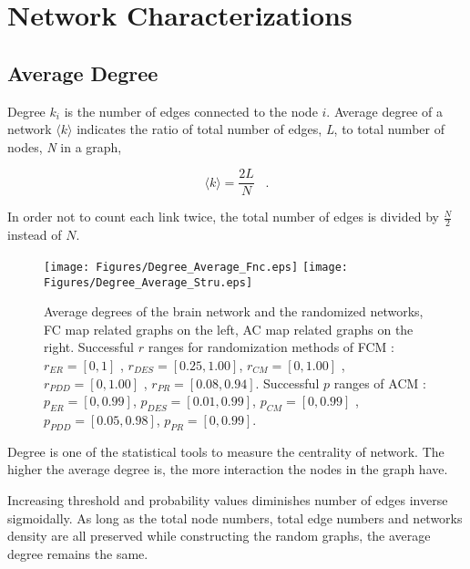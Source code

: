 
\chapter{Network Characterizations} %

\label{AppendixB} %


\section{Average Degree}

Degree $k_i$ is the number of edges connected to the node $i$. Average degree of a network $\langle k \rangle$ indicates the ratio of total number of edges, \textit{L}, to total number of nodes, \textit{N} in a graph,
 
\begin{equation}
\langle k \rangle = \frac{2L}{N} \;\;\;.
\end{equation} 
 
In order not to count each link twice, the total number of edges is divided by $\frac{N}{2}$ instead of $N$. 
 

\begin{figure}[htbp]
 
  \centering
	 \texttt{[image: Figures/Degree\_Average\_Fnc.eps]}
	 \texttt{[image: Figures/Degree\_Average\_Stru.eps]}
  \caption[Average Degree]{Average degrees of the brain network and the randomized networks, FC map related graphs on the left, AC map related graphs on the right. Successful $r$ ranges for randomization methods of FCM :  $r_{ER}=[0,1]$ , $r_{DES} = [0.25,1.00]$, $r_{CM} = [0,1.00]$ , $r_{PDD} = [0,1.00]$ , $r_{PR} = [0.08,0.94]$. Successful $p$ ranges of ACM : $p_{ER}=[0,0.99]$, $p_{DES}=[0.01 , 0.99]$, $p_{CM}=[0, 0.99]$ , $p_{PDD}=[0.05 , 0.98]$, $p_{PR} = [0,0.99]$.} 
    \label{fig:Average Degree}
 	
\end{figure}  


Degree is one of the statistical tools to measure the centrality of network. The higher the average degree is, the more interaction the nodes in the graph have. 

Increasing threshold and probability values diminishes number of edges inverse sigmoidally. As long as the total node numbers, total edge numbers and networks density are all preserved while constructing the random graphs, the average degree remains the same. 

